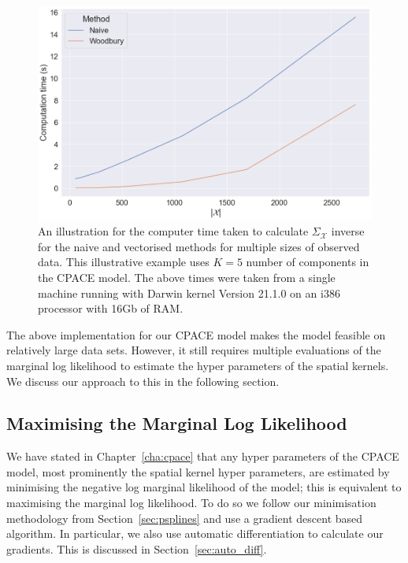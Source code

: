 \begin{figure}
	\centering
	\includegraphics[width=\textwidth]{imp_woodbury}
	\caption[An illustration for the computer time taken to calculate $\Sigma_\mathcal{X}$  inverse for the naive and vectorised methods for multiple sizes of observed data.]{An illustration for the computer time taken to calculate $\Sigma_\mathcal{X}$  inverse for the naive and vectorised methods for multiple sizes of observed data. This illustrative example uses $K=5$ number of components in the CPACE model. The above times were taken from a single machine running with Darwin kernel Version 21.1.0 on an i386 processor with 16Gb of RAM.}
	\label{fig:imp_woodbury}
\end{figure}

The above implementation for our CPACE model makes the model feasible on relatively large data sets.
However, it still requires multiple evaluations of the marginal log likelihood to estimate the hyper parameters of the spatial kernels.
We discuss our approach to this in the following section.

\subsection{Maximising the Marginal Log Likelihood \label{ssec:imp_gp_min}}
We have stated in Chapter~\ref{cha:cpace} that any hyper parameters of the CPACE model, most prominently the spatial kernel hyper parameters, are estimated by minimising the negative log marginal likelihood of the model; this is equivalent to maximising the marginal log likelihood.
To do so we follow our minimisation methodology from Section~\ref{sec:psplines} and use a gradient descent based algorithm.
In particular, we also use automatic differentiation to calculate our gradients.
This is discussed in Section~\ref{sec:auto_diff}.

